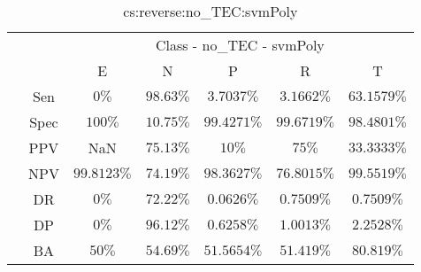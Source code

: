\begin{table}[!ht]
	\centering
	\begin{tabular}{|c|c|c|c|c|c|c|}
		\cline{3-7}
		\multicolumn{2}{c|}{} & \multicolumn{5}{c|}{Class - no_TEC - svmPoly} \\ \cline{3-7}
		\multicolumn{2}{c|}{} & E & N & P & R & T \\ \hline
		\multirow{7}{*}{\rotatebox{90}{Statistics}} & Sen & $0\%$ & $98.63\%$ & $3.7037\%$ & $3.1662\%$ & $63.1579\%$ \\ \cline{2-7}
		 & Spec & $100\%$ & $10.75\%$ & $99.4271\%$ & $99.6719\%$ & $98.4801\%$ \\ \cline{2-7}
		 & PPV & NaN & $75.13\%$ & $10\%$ & $75\%$ & $33.3333\%$ \\ \cline{2-7}
		 & NPV & $99.8123\%$ & $74.19\%$ & $98.3627\%$ & $76.8015\%$ & $99.5519\%$ \\ \cline{2-7}
		 & DR & $0\%$ & $72.22\%$ & $0.0626\%$ & $0.7509\%$ & $0.7509\%$ \\ \cline{2-7}
		 & DP & $0\%$ & $96.12\%$ & $0.6258\%$ & $1.0013\%$ & $2.2528\%$ \\ \cline{2-7}
		 & BA & $50\%$ & $54.69\%$ & $51.5654\%$ & $51.419\%$ & $80.819\%$ \\ \hline
	\end{tabular}
	\caption{cs:reverse:no_TEC:svmPoly}
	\label{tab:cs:reverse:no_TEC:svmPoly}
\end{table}
